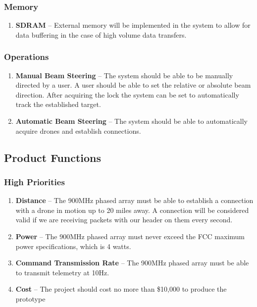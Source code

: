 \documentclass[ProjectRequirements.tex]{subfiles}
\begin{document}
		\subsubsection{Memory}
			\begin{enumerate}\itemsep1pt
				\item \textbf{SDRAM} -- External memory will be implemented in the system to allow for data buffering in the case of high volume data transfers.  
			\end{enumerate}
		
		\subsubsection{Operations}
			\begin{enumerate}\itemsep1pt
				\item \textbf{Manual Beam Steering} -- The system should be able to be manually directed by a user.  A user should be able to set the relative or absolute beam direction.  After acquiring the lock the system can be set to automatically track the established target.
				\item \textbf{Automatic Beam Steering} -- The system should be able to automatically acquire drones and establish connections.
			\end{enumerate}
		
	\subsection{Product Functions}
	
		\subsubsection{High Priorities}
			\begin{enumerate}
				\item \textbf{Distance} -- The 900MHz phased array must be able to establish a connection with a drone in motion up to 20 miles away. A connection will be considered valid if we are receiving packets with our header on them every second.
				\item \textbf{Power} -- The 900MHz phased array must never exceed the FCC maximum power specifications, which is 4 watts.
				\item \textbf{Command Transmission Rate} -- The 900MHz phased array must be able to transmit telemetry at 10Hz.
				\item \textbf{Cost} -- The project should cost no more than \$10,000 to produce the prototype
							
			\end{enumerate}
		
\end{document}
